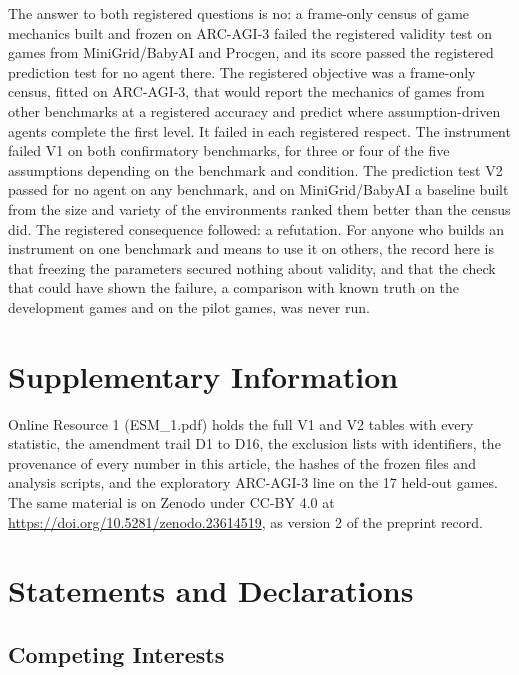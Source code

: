 \documentclass[twocolumn]{svjour3}
\begin{document}
The answer to both registered questions is no: a frame-only census of
game mechanics built and frozen on ARC-AGI-3 failed the registered
validity test on games from MiniGrid/BabyAI and Procgen, and its score
passed the registered prediction test for no agent there. The registered
objective was a frame-only census, fitted on ARC-AGI-3, that would
report the mechanics of games from other benchmarks at a registered
accuracy and predict where assumption-driven agents complete the first
level. It failed in each registered respect. The instrument failed V1 on
both confirmatory benchmarks, for three or four of the five assumptions
depending on the benchmark and condition. The prediction test V2 passed
for no agent on any benchmark, and on MiniGrid/BabyAI a baseline built
from the size and variety of the environments ranked them better than
the census did. The registered consequence followed: a refutation. For
anyone who builds an instrument on one benchmark and means to use it on
others, the record here is that freezing the parameters secured nothing
about validity, and that the check that could have shown the failure, a
comparison with known truth on the development games and on the pilot
games, was never run.

\section*{Supplementary Information}\label{supplementary-information}

Online Resource 1 (ESM\_1.pdf) holds the full V1 and V2 tables with
every statistic, the amendment trail D1 to D16, the exclusion lists with
identifiers, the provenance of every number in this article, the hashes
of the frozen files and analysis scripts, and the exploratory ARC-AGI-3
line on the 17 held-out games. The same material is on Zenodo under
CC-BY 4.0 at \url{https://doi.org/10.5281/zenodo.23614519}, as version 2
of the preprint record.

\section*{Statements and
Declarations}\label{statements-and-declarations}

\subsection*{Competing Interests}\label{competing-interests}
\end{document}

